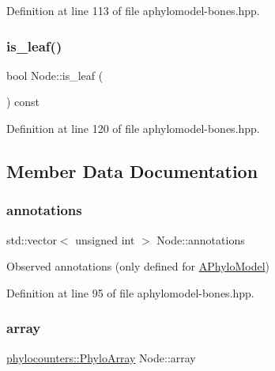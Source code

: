 Definition at line 113 of file aphylomodel-\/bones.\+hpp.

\mbox{\label{class_node_af7cc2d0f435e3bee4388a0e9ab42adb8}} 
\subsubsection{\texorpdfstring{is\+\_\+leaf()}{is\_leaf()}}
{\footnotesize\ttfamily bool Node\+::is\+\_\+leaf (\begin{DoxyParamCaption}{ }\end{DoxyParamCaption}) const\hspace{0.3cm}{\ttfamily [inline]}}



Definition at line 120 of file aphylomodel-\/bones.\+hpp.



\subsection{Member Data Documentation}
\mbox{\label{class_node_aea43a76094980788d1debd3e18ed8070}} 
\subsubsection{\texorpdfstring{annotations}{annotations}}
{\footnotesize\ttfamily std\+::vector$<$ unsigned int $>$ Node\+::annotations}



Observed annotations (only defined for \hyperlink{class_a_phylo_model}{A\+Phylo\+Model}) 



Definition at line 95 of file aphylomodel-\/bones.\+hpp.

\mbox{\label{class_node_a86d6575dd1ad7ab0cb02c6e6202b0608}} 
\subsubsection{\texorpdfstring{array}{array}}
{\footnotesize\ttfamily \hyperlink{namespacebarry_1_1counters_1_1phylo_abd293bf65e494e903639fb5fb2c91604}{phylocounters\+::\+Phylo\+Array} Node\+::array}



